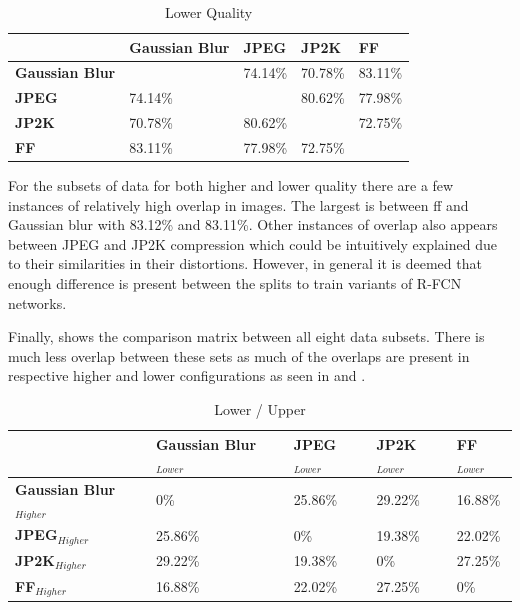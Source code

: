 \begin{table}[h]
\centering
\caption{Lower Quality}
\label{tab:lowcomp}
\begin{tabular}{|l|l|l|l|l|}
\hline
             & \textbf{Gaussian Blur}  & \textbf{JPEG} & \textbf{JP2K} & \textbf{FF}     \\ \hline
\textbf{Gaussian Blur}  &                & 74.14\%   & 70.78\% & 83.11\% \\ \hline
\textbf{JPEG}    & 74.14\% &                & 80.62\% & 77.98\% \\ \hline
\textbf{JP2K}   & 70.78\% & 80.62\% &                & 72.75\% \\ \hline
\textbf{FF}  & 83.11\% & 77.98\% & 72.75\% &                \\ \hline
\end{tabular}
\end{table}

For the subsets of data for both higher and lower quality there are a few instances of relatively high overlap in images. The largest is between \gls{ff}  and Gaussian blur with 83.12\% and 83.11\%. Other instances of overlap also appears between JPEG and JP2K compression which could be intuitively explained due to their similarities in their distortions. However, in general it is deemed that enough difference is present between the splits to train variants of R-FCN networks.

Finally,  shows the comparison matrix between all eight data subsets. There is much less overlap between these sets as much of the overlaps are present in respective higher and lower configurations as seen in  and .

\begin{table}[]
\centering
\caption{Lower / Upper}
\label{tab:lowhighcomp}
\begin{tabular}{|l|l|l|l|l|}
\hline
                 & \textbf{Gaussian Blur$_{Lower}$} & \textbf{JPEG$_{Lower}$} & \textbf{JP2K$_{Lower}$} & \textbf{FF$_{Lower}$} \\ \hline
\textbf{Gaussian Blur$_{Higher}$}  & 0\%             & 25.86\% & 29.22\% & 16.88\%    \\ \hline
\textbf{JPEG$_{Higher}$} & 25.86\%      & 0\%        & 19.38\% & 22.02\%    \\ \hline
\textbf{JP2K$_{Higher}$} & 29.22\%      & 19.38\% & 0\%        & 27.25\%    \\ \hline
\textbf{FF$_{Higher}$} & 16.88\%      & 22.02\% & 27.25\% & 0\%           \\ \hline
\end{tabular}
\end{table}

